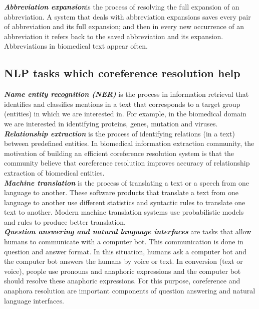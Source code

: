 \emph{\textbf{Abbreviation expansion}}is the process of resolving the full expansion of an abbreviation. A system that deals with abbreviation expansions saves every pair of abbreviation and its full expansion; and then in every new occurrence of an abbreviation it refers back to the saved abbreviation and its expansion. Abbreviations in biomedical text appear often. \\

\subsection{NLP tasks which coreference resolution help}

\emph {\textbf{ Name entity recognition (NER)}} is the process in information retrieval that identifies and classifies mentions in a text that corresponds to a target group (entities) in which we are interested in. For example, in the biomedical domain we are interested in identifying proteins, genes, mutation and viruses. \\

\emph{\textbf{Relationship extraction}} is the process of identifying relations (in a text) between predefined entities. In biomedical information extraction community, the motivation of building an efficient coreference resolution system is that the community believe that coreference resolution improves accuracy of relationship extraction of biomedical entities. \\

\emph{\textbf{Machine translation}} is the process of translating a text or a speech from one language to another. These software products that translate a text from one language to another use different statistics and syntactic rules to translate one text to another. Modern machine translation systems use probabilistic models and rules to produce better translation. \\

\emph{\textbf{Question answering and natural language interfaces}} are tasks that allow humans to communicate with a computer bot. This communication is done in question and answer format. In this situation, humans ask a computer bot and the computer bot answers the humans by voice or text. In conversion (text or voice), people use pronouns and anaphoric expressions and the computer bot should resolve these anaphoric expressions. For this purpose, coreference and anaphora resolution are important components of question answering and natural language interfaces.\\

